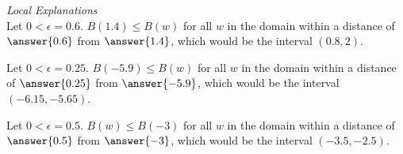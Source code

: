 \documentclass{ximera}
\begin{document}
\textit{Local Explanations} \\

Let $0 < \epsilon = 0.6$.  $B(1.4) \leq B(w)$ for all $w$ in the domain within a distance of $\answer{0.6}$ from $\answer{1.4}$, which would be the interval $(0.8, 2)$.

Let $0 < \epsilon = 0.25$.  $B(-5.9) \leq B(w)$ for all $w$ in the domain within a distance of $\answer{0.25}$ from $\answer{-5.9}$, which would be the interval $(-6.15, -5.65)$.

Let $0 < \epsilon = 0.5$.  $B(w) \leq B(-3)$ for all $w$ in the domain within a distance of $\answer{0.5}$ from $\answer{-3}$, which would be the interval $(-3.5, -2.5)$.
\end{document}
